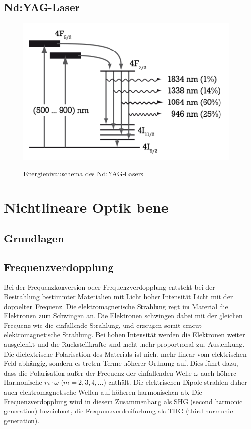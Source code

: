 \documentclass[twoside,colorback,accentcolor=tud4c,11pt]{tudreport}
\begin{document}
\subsection{Nd:YAG-Laser}
\begin{figure}[H]
\centering
   	\begin{minipage}[b]{0.5\textwidth}
   	\includegraphics[width=\textwidth]{graphics/ndyagschem.PNG}
  	\label{ndschem}
   	\end{minipage}
\caption{Energienivauschema des Nd:YAG-Lasers}\cite{anl} 	
\end{figure}
\section{Nichtlineare Optik bene}
\subsection{Grundlagen}
\subsection{Frequenzverdopplung}
Bei der Frequenzkonversion oder Frequenzverdopplung entsteht bei der Bestrahlung bestimmter Materialien mit Licht hoher Intensität Licht mit der doppelten Frequenz. Die elektromagnetische Strahlung regt im Material die Elektronen zum Schwingen an. Die Elektronen schwingen dabei mit der gleichen Frequenz wie die einfallende Strahlung, und erzeugen somit erneut elektromagnetische Strahlung. Bei hohen Intensität werden die Elektronen weiter ausgelenkt und die Rückstellkräfte sind nicht mehr proportional zur Auslenkung. Die dielektrische Polarisation des Materials ist nicht mehr linear vom elektrischen Feld abhängig, sondern es treten Terme höherer Ordnung auf. Dies führt dazu, dass die Polarisation außer der Frequenz der einfallenden Welle $\omega$ auch höhere Harmonische $m\cdot \omega$ ($m=2,3,4,...$) enthält. Die elektrischen Dipole strahlen daher auch elektromagnetische Wellen auf höheren harmonischen ab. Die Frequenzverdopplung wird in diesem Zusammenhang als SHG (second harmonic generation) bezeichnet, die Frequenzverdreifachung als THG (third harmonic generation).	
\end{document}
